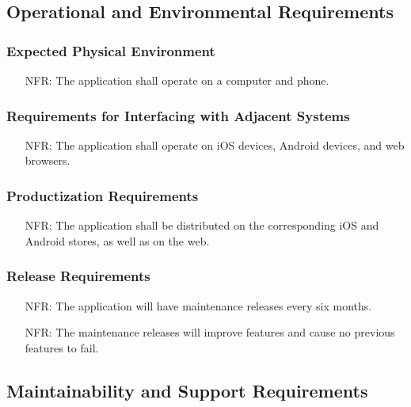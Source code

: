\documentclass[12pt]{article}
\newcounter{nfrnum} %
\begin{document}
\subsection{Operational and Environmental Requirements}
  \subsubsection{Expected Physical Environment}
    \noindent\begin{itemize}
      \item[NFR\refstepcounter{nfrnum}\thenfrnum:] 
        The application shall operate on a computer and phone.  
    \end{itemize}
  \subsubsection{Requirements for Interfacing with Adjacent Systems}
    \noindent\begin{itemize}
      \item[NFR\refstepcounter{nfrnum}\thenfrnum:] 
        The application shall operate on iOS devices, Android devices, and web browsers.
    \end{itemize}  
  \subsubsection{Productization Requirements}
    \noindent\begin{itemize}
      \item[NFR\refstepcounter{nfrnum}\thenfrnum:] 
        The application shall be distributed on the corresponding iOS and Android stores, as well as on the web.
    \end{itemize} 
  \subsubsection{Release Requirements}
    \noindent\begin{itemize}
      \item[NFR\refstepcounter{nfrnum}\thenfrnum:] 
        The application will have maintenance releases every six months.
      \item[NFR\refstepcounter{nfrnum}\thenfrnum:] 
        The maintenance releases will improve features and cause no previous features to fail.
    \end{itemize}  

\subsection{Maintainability and Support Requirements}
\end{document}
